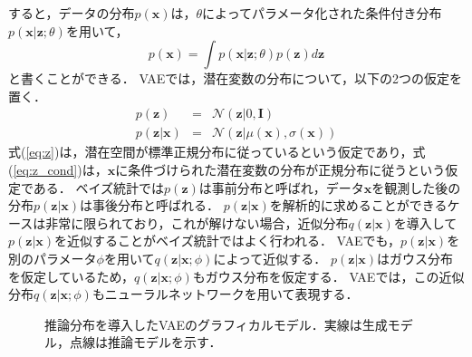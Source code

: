 すると，データの分布$p(\bm{x})$は，$\theta$によってパラメータ化された条件付き分布$p(\bm{x}| \bm{z}; \theta)$を用いて，
\begin{equation}
p(\bm{x}) = \int p(\bm{x}|\bm{z};\theta) p(\bm{z}) d\bm{z} \label{eq:vae}
\end{equation}
と書くことができる．
VAEでは，潜在変数の分布について，以下の2つの仮定を置く．
\begin{eqnarray}
p(\bm{z}) &=& \mathcal{N}(\bm{z}|0,\bm{I}) \label{eq:z}\\
p(\bm{z}|\bm{x}) &=& \mathcal{N}(\bm{z}|\mu(\bm{x}),\sigma(\bm{x}))	\label{eq:z_cond}
\end{eqnarray}
式(\ref{eq:z})は，潜在空間が標準正規分布に従っているという仮定であり，式(\ref{eq:z_cond})は，$\bm{x}$に条件づけられた潜在変数の分布が正規分布に従うという仮定である．
ベイズ統計では$p(\bm{z})$は事前分布と呼ばれ，データ$\bm{x}$を観測した後の分布$p(\bm{z}|\bm{x})$は事後分布と呼ばれる．
$p(\bm{z}|\bm{x})$を解析的に求めることができるケースは非常に限られており，これが解けない場合，近似分布$q(\bm{z}|\bm{x})$を導入して$p(\bm{z}|\bm{x})$を近似することがベイズ統計ではよく行われる．
VAEでも，$p(\bm{z}| \bm{x})$を別のパラメータ$\phi$を用いて$q(\bm{z}|\bm{x};\phi)$によって近似する．
$p(\bm{z}|\bm{x})$はガウス分布を仮定しているため，$q(\bm{z}|\bm{x};\phi)$もガウス分布を仮定する．
VAEでは，この近似分布$q(\bm{z}|\bm{x};\phi)$もニューラルネットワークを用いて表現する．

\begin{figure}[tbp]
  \begin{center}
  \caption{推論分布を導入したVAEのグラフィカルモデル．実線は生成モデル，点線は推論モデルを示す．}
  \label{fig:gm_vae_inference}
  \end{center}
  \end{figure}


